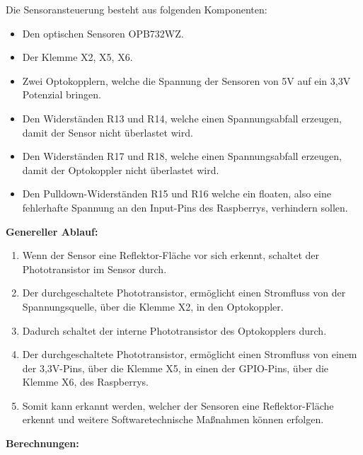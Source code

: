 Die Sensoransteuerung besteht aus folgenden Komponenten:
\begin{itemize}
\item Den optischen Sensoren OPB732WZ.
\item Der Klemme X2, X5, X6. 
\item Zwei Optokopplern, welche die Spannung der Sensoren von 5V auf ein 3,3V Potenzial bringen.
\item Den Widerständen R13 und R14, welche einen Spannungsabfall erzeugen, damit der Sensor nicht überlastet wird.
\item Den Widerständen R17 und R18, welche einen Spannungsabfall erzeugen, damit der Optokoppler nicht überlastet wird.
\item Den Pulldown-Widerständen R15 und R16 welche ein floaten, also eine fehlerhafte Spannung an den Input-Pins des Raspberrys, verhindern sollen.\\
\end{itemize}
\textbf{Genereller Ablauf:}
\begin{enumerate}
\item Wenn der Sensor eine Reflektor-Fläche vor sich erkennt, schaltet der Phototransistor im Sensor durch.
\item Der durchgeschaltete Phototransistor, ermöglicht einen Stromfluss von der Spannungsquelle, über die Klemme X2, in den Optokoppler.
\item Dadurch schaltet der interne Phototransistor des Optokopplers durch.
\item Der durchgeschaltete Phototransistor, ermöglicht einen Stromfluss von einem der 3,3V-Pins, über die Klemme X5, in einen der GPIO-Pins, über die Klemme X6, des Raspberrys.
\item Somit kann erkannt werden, welcher der Sensoren eine Reflektor-Fläche erkennt und weitere Softwaretechnische Maßnahmen können erfolgen.
\end{enumerate}
\textbf{Berechnungen:}
